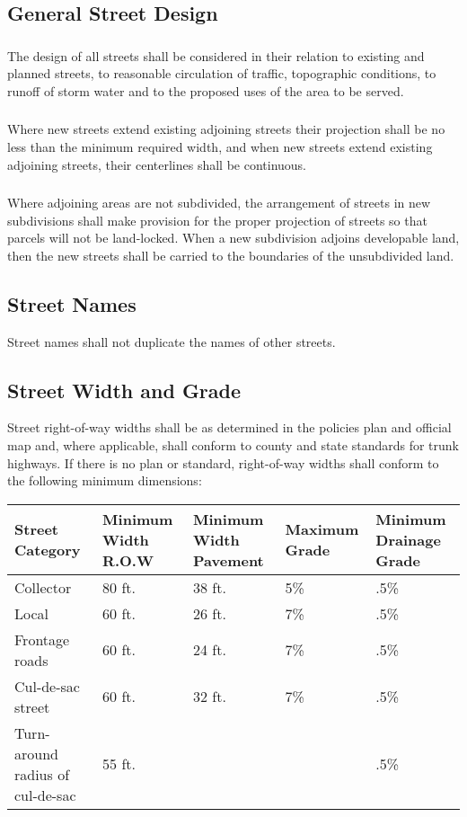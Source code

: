 \subsection{General Street Design}
\subsubsection{}
The design of all streets shall be considered in their relation to existing and planned streets, to reasonable circulation of traffic, topographic conditions, to runoff of storm water and to the proposed uses of the area to be served.
\subsubsection{}
Where new streets extend existing adjoining streets their projection shall be no less than the minimum required width, and when new streets extend existing adjoining streets, their centerlines shall be continuous.
\subsubsection{}
Where adjoining areas are not subdivided, the arrangement of streets in new subdivisions shall make provision for the proper projection of streets so that parcels will not be land-locked.  When a new subdivision adjoins developable land, then the new streets shall be carried to the boundaries of the unsubdivided land.
\subsection{Street Names}
Street names shall not duplicate the names of other streets.
\subsection{Street Width and Grade}
Street right-of-way widths shall be as determined in the policies plan and official map and, where applicable, shall conform to county and state standards for trunk highways.  If there is no plan or standard, right-of-way widths shall conform to the following minimum dimensions:\\
\begin{center}
\begin{tabular}{|p{2.5cm}|p{2.5cm}|p{2.5cm}|p{2.5cm}|p{2.5cm}|}
    \hline
    \textbf{Street Category} & \textbf{Minimum Width R.O.W} & \textbf{Minimum Width Pavement} & \textbf{Maximum Grade} & \textbf{Minimum Drainage Grade}\\
    \hline
    Collector & 80 ft. & 38 ft. & 5\% & .5\%\\
    \hline
    Local & 60 ft. & 26 ft. & 7\% & .5\%\\
    \hline
    Frontage roads & 60 ft. & 24 ft. & 7\% & .5\%\\
    \hline
    Cul-de-sac street & 60 ft. & 32 ft. & 7\% & .5\%\\
    \hline
    Turn-around radius of cul-de-sac & 55 ft. & & & .5\%\\
    \hline
\end{tabular}
\end{center}
